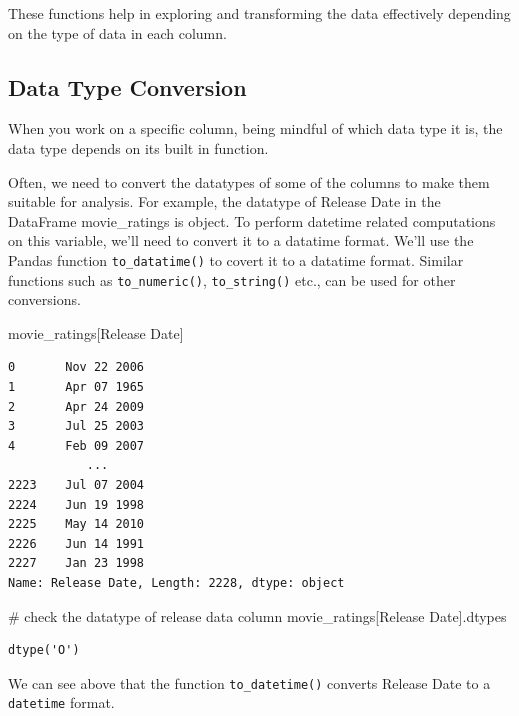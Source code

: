 \documentclass[
  letterpaper,
  DIV=11,
  numbers=noendperiod]{scrreprt}
\newenvironment{Shaded}{\begin{snugshade}}{\end{snugshade}}
\newcommand{\CommentTok}[1]{\textcolor[rgb]{0.37,0.37,0.37}{#1}}
\newcommand{\NormalTok}[1]{\textcolor[rgb]{0.00,0.23,0.31}{#1}}
\newcommand{\StringTok}[1]{\textcolor[rgb]{0.13,0.47,0.30}{#1}}
\begin{document}
These functions help in exploring and transforming the data effectively
depending on the type of data in each column.

\hypertarget{data-type-conversion}{%
\subsection{Data Type Conversion}\label{data-type-conversion}}

When you work on a specific column, being mindful of which data type it
is, the data type depends on its built in function.

Often, we need to convert the datatypes of some of the columns to make
them suitable for analysis. For example, the datatype of Release Date in
the DataFrame movie\_ratings is object. To perform datetime related
computations on this variable, we'll need to convert it to a datatime
format. We'll use the Pandas function \texttt{to\_datatime()} to covert
it to a datatime format. Similar functions such as
\texttt{to\_numeric()}, \texttt{to\_string()} etc., can be used for
other conversions.

\begin{Shaded}
\begin{Highlighting}[]
\NormalTok{movie\_ratings[}\StringTok{\textquotesingle{}Release Date\textquotesingle{}}\NormalTok{]}
\end{Highlighting}
\end{Shaded}

\begin{verbatim}
0       Nov 22 2006
1       Apr 07 1965
2       Apr 24 2009
3       Jul 25 2003
4       Feb 09 2007
           ...     
2223    Jul 07 2004
2224    Jun 19 1998
2225    May 14 2010
2226    Jun 14 1991
2227    Jan 23 1998
Name: Release Date, Length: 2228, dtype: object
\end{verbatim}

\begin{Shaded}
\begin{Highlighting}[]
\CommentTok{\# check the datatype of release data column }
\NormalTok{movie\_ratings[}\StringTok{\textquotesingle{}Release Date\textquotesingle{}}\NormalTok{].dtypes}
\end{Highlighting}
\end{Shaded}

\begin{verbatim}
dtype('O')
\end{verbatim}

We can see above that the function \texttt{to\_datetime()} converts
Release Date to a \texttt{datetime} format.
\end{document}
